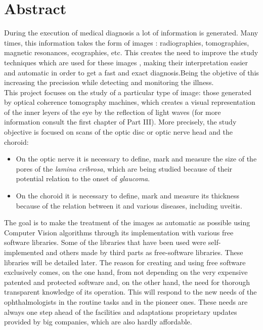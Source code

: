 \chapter*{Abstract}
During the execution of medical diagnosis a lot of information is
generated.  Many times, this information takes the form of images
\emph{\citep*[1. The Analysis of Medical Images, 2. Digital Image
  Acquisition]{toennies2012guide}}: radiographies, tomographies,
magnetic resonances, ecographies, etc.  This creates the need to
improve the study techniques which are used for these images
\emph{\citep*[4. Image Enhancement]{toennies2012guide}}, making their
interpretation easier and automatic in order to get a fast and exact
diagnosis.Being the objetive of this increasing the
precission while detecting and monitoring the illness.\\
This project focuses on the study of a particular type of image: those
generated by optical coherence tomography machines, which creates a
visual representation of the inner leyers of the eye by the reflection
of light waves (for more information consult the first chapter of Part
III). More precisely, the study objective is focused on scans of the
optic disc or optic nerve head and the choroid:
\begin{itemize}
\item On the optic nerve it is necessary to define, mark and measure
  the size of the pores of the \emph{lamina cribrosa}, which are being
  studied because of their potential relation to the onset of \emph{glaucoma}.
\item On the choroid it is necessary to define, mark and measure its
  thickness because of the relation between it and various diseases, including uveitis.
\end{itemize}
The goal is to make the treatment of the images as automatic as
possible using Computer Vision algorithms through its implementation
with various free software libraries. Some of the libraries that have
been used were self-implemented and others made by third parts as
free-software libraries. These libraries will be detailed later. The
reason for creating and using free software exclusively comes, on the
one hand, from not depending on the very expensive patented and protected
software and, on the other hand, the need for thorough transparent
knowledge of its operation. This will respond to the new needs of the
ophthalmologists in the routine tasks and in the pioneer ones. These needs 
are always one step ahead of the
facilities and adaptations proprietary updates provided by big
companies, which are also hardly affordable.